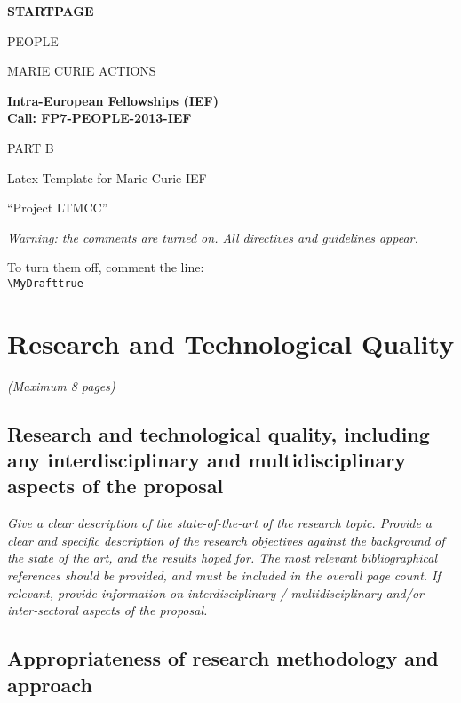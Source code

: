 \documentclass[a4paper,11pt]{article}
\title{\mytitle}
\newif\ifMyDraft%
\newcommand{\projectname}[0]{Project LTMCC\xspace}
\newcommand{\mytitle}{Latex Template for Marie Curie IEF}
\newenvironment{xcomment}{\em}{}
\newcommand{\cover}[1]{%
\newpage
\begin{center}
\vspace{4cm}
\textbf{#1}
\vspace{4cm}

PEOPLE

MARIE CURIE ACTIONS

\vspace{1cm}

\textbf{Intra-European Fellowships (IEF)}\\
\textbf{Call: FP7-PEOPLE-2013-IEF}

\vspace{4cm}

\Large{PART B}
\vspace{2cm}

\Huge{\mytitle}

\vspace{1cm}

\Large{``\projectname''}

\end{center}
\newpage
}
\begin{document}
\cover{STARTPAGE}

\newpage

\begin{xcomment} 
Warning: the comments are turned on. All directives and guidelines appear.

To turn them off, comment the line:\\ 
\verb|\MyDrafttrue|\\

\end{xcomment} 


\section{Research and Technological Quality}

\begin{xcomment}  
(Maximum 8 pages)  
\end{xcomment}

\subsection{Research and technological quality, including any interdisciplinary and multidisciplinary aspects of the proposal}

\begin{xcomment}
Give a clear description of the state-of-the-art of the research topic. Provide a clear and specific
description of the research objectives against the background of the state of the art, and the
results hoped for. The most relevant bibliographical references should be provided, and must be
included in the overall page count. If relevant, provide information on interdisciplinary /
multidisciplinary and/or inter-sectoral aspects of the proposal.
\end{xcomment}

\subsection{Appropriateness of research methodology and approach}
\end{document}
